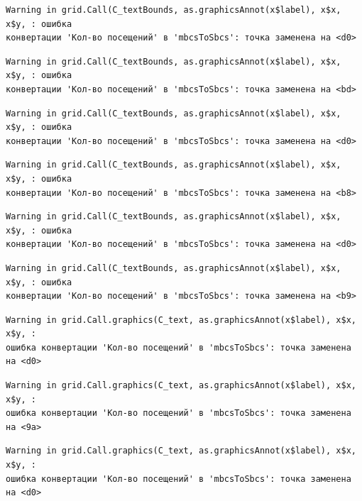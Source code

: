 \documentclass[
  letterpaper,
  DIV=11,
  numbers=noendperiod]{scrreprt}
\begin{document}
\begin{verbatim}
Warning in grid.Call(C_textBounds, as.graphicsAnnot(x$label), x$x, x$y, : ошибка
конвертации 'Кол-во посещений' в 'mbcsToSbcs': точка заменена на <d0>
\end{verbatim}

\begin{verbatim}
Warning in grid.Call(C_textBounds, as.graphicsAnnot(x$label), x$x, x$y, : ошибка
конвертации 'Кол-во посещений' в 'mbcsToSbcs': точка заменена на <bd>
\end{verbatim}

\begin{verbatim}
Warning in grid.Call(C_textBounds, as.graphicsAnnot(x$label), x$x, x$y, : ошибка
конвертации 'Кол-во посещений' в 'mbcsToSbcs': точка заменена на <d0>
\end{verbatim}

\begin{verbatim}
Warning in grid.Call(C_textBounds, as.graphicsAnnot(x$label), x$x, x$y, : ошибка
конвертации 'Кол-во посещений' в 'mbcsToSbcs': точка заменена на <b8>
\end{verbatim}

\begin{verbatim}
Warning in grid.Call(C_textBounds, as.graphicsAnnot(x$label), x$x, x$y, : ошибка
конвертации 'Кол-во посещений' в 'mbcsToSbcs': точка заменена на <d0>
\end{verbatim}

\begin{verbatim}
Warning in grid.Call(C_textBounds, as.graphicsAnnot(x$label), x$x, x$y, : ошибка
конвертации 'Кол-во посещений' в 'mbcsToSbcs': точка заменена на <b9>
\end{verbatim}

\begin{verbatim}
Warning in grid.Call.graphics(C_text, as.graphicsAnnot(x$label), x$x, x$y, :
ошибка конвертации 'Кол-во посещений' в 'mbcsToSbcs': точка заменена на <d0>
\end{verbatim}

\begin{verbatim}
Warning in grid.Call.graphics(C_text, as.graphicsAnnot(x$label), x$x, x$y, :
ошибка конвертации 'Кол-во посещений' в 'mbcsToSbcs': точка заменена на <9a>
\end{verbatim}

\begin{verbatim}
Warning in grid.Call.graphics(C_text, as.graphicsAnnot(x$label), x$x, x$y, :
ошибка конвертации 'Кол-во посещений' в 'mbcsToSbcs': точка заменена на <d0>
\end{verbatim}
\end{document}
